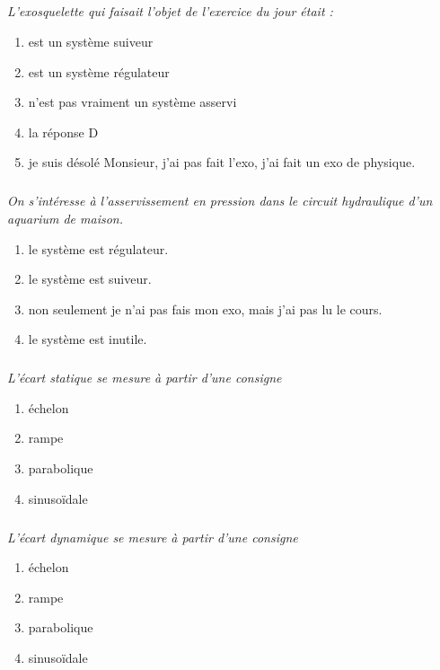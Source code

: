 \documentclass[10pt,fleqn]{article} %
\begin{document}
\def\pathfig{images}

\vspace{6cm}
\pagestyle{fancy}
\thispagestyle{plain}

\def\columnseprulecolor{\color{ocre}}
\setlength{\columnseprule}{0.4pt} 

\def\pathfig{images}

\begin{multicols}{2}


\subparagraph{}\textit{L'exosquelette qui faisait l'objet de l'exercice du jour était :}
\begin{enumerate}
\item est un système suiveur
\item est un système régulateur
\item n'est pas vraiment un système asservi
\item la réponse D
\item je suis désolé Monsieur, j'ai pas fait l'exo, j'ai fait un exo de physique.
\end{enumerate}

\subparagraph{}\textit{On s'intéresse à l'asservissement en pression dans le circuit hydraulique d'un aquarium de maison.}
\begin{enumerate}
\item le système est régulateur.
\item le système est suiveur.
\item non seulement je n'ai pas fais mon exo, mais j'ai pas lu le cours.
\item le système est inutile.
\end{enumerate}

\subparagraph{}\textit{L'écart statique se mesure à partir d'une consigne}
\begin{enumerate}
\item échelon
\item rampe
\item parabolique
\item sinusoïdale
\end{enumerate}

\subparagraph{}\textit{L'écart dynamique se mesure à partir d'une consigne}
\begin{enumerate}
\item échelon
\item rampe
\item parabolique
\item sinusoïdale
\end{enumerate}


\end{multicols}
\end{document}
